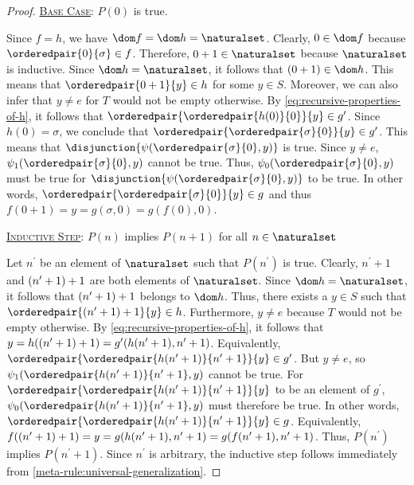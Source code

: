 \begin{proof}
    \vspace{0.3cm}
    \noindent
    \underline{\scshape Base Case}: \( P(0) \) is true.

    \vspace{0.3cm}
    \noindent
    Since \( f = h \), we have \( \dom f = \dom h = \naturalset \). Clearly, \( 0 \in \dom f \) because \( \orderedpair{0}{\sigma} \in f \).
    Therefore, \( 0 + 1 \in \naturalset \) because \( \naturalset \) is inductive.
    Since \( \dom h = \naturalset \), it follows that \( \mleft( 0 + 1 \mright) \in \dom h \).
    This means that \( \orderedpair{0 + 1}{y} \in h \) for some \( y \in S \).
    Moreover, we can also infer that \( y \neq e \) for \( T \) would not be empty otherwise.
    By \eqref{eq:recursive-properties-of-h}, it follows that \( \orderedpair{\orderedpair{h(0)}{0}}{y} \in g^{\prime} \).
    Since \( h(0) = \sigma \), we conclude that \( \orderedpair{\orderedpair{\sigma}{0}}{y} \in g^{\prime} \).
    This means that \( \disjunction{\psi( \orderedpair{\sigma}{0}, y )} \) is true.
    Since \( y \neq e \), \( \psi_{1}(\orderedpair{\sigma}{0}, y) \) cannot be true.
    Thus, \( \psi_{0}(\orderedpair{\sigma}{0}, y) \) must be true for \( \disjunction{\psi( \orderedpair{\sigma}{0}, y )} \) to be true.
    In other words, \( \orderedpair{\orderedpair{\sigma}{0}}{y} \in g \) and thus \( f(0 + 1) = y = g(\sigma, 0) = g(f(0), 0) \).

    \vspace{0.3cm}
    \noindent
    \underline{\scshape Inductive Step}: \( P(n) \) implies \( P(n + 1) \) for all \( n \in \naturalset \)

    \vspace{0.3cm}
    \noindent
    Let \( n^{\prime} \) be an element of \( \naturalset \) such that \( P(n^{\prime}) \) is true.
    Clearly, \( n^{\prime} + 1 \) and \( \mleft( n^{\prime} + 1 \mright) + 1 \) are both elements of \( \naturalset \).
    Since \( \dom h = \naturalset \), it follows that \( \mleft( n^{\prime} + 1 \mright) + 1 \) belongs to \( \dom h \).
    Thus, there exists a \( y \in S \) such that \( \orderedpair{\mleft( n^{\prime} + 1 \mright) + 1}{y} \in h \).
    Furthermore, \( y \neq e \) because \( T \) would not be empty otherwise.
    By \eqref{eq:recursive-properties-of-h}, it follows that
    \( y = h(\mleft( n^{\prime} + 1 \mright) + 1) = g^{\prime}(h(n^{\prime} + 1), n^{\prime} + 1) \).
    Equivalently, \( \orderedpair{\orderedpair{h(n^{\prime} + 1)}{n^{\prime} + 1}}{y} \in g^{\prime} \).
    But \( y \neq e \), so \( \psi_{1}( \orderedpair{h(n^{\prime} + 1)}{n^{\prime} + 1}, y ) \) cannot be true.
    For \( \orderedpair{\orderedpair{h(n^{\prime} + 1)}{n^{\prime} + 1}}{y} \) to be an element of \( g^{\prime} \),
    \( \psi_{0}( \orderedpair{h(n^{\prime} + 1)}{n^{\prime} + 1}, y ) \) must therefore be true.
    In other words, \( \orderedpair{\orderedpair{h(n^{\prime} + 1)}{n^{\prime} + 1}}{y} \in g \).
    Equivalently, \( f(\mleft( n^{\prime} + 1 \mright) + 1) =  y = g(h(n^{\prime} + 1), n^{\prime} + 1) = g(f(n^{\prime} + 1), n^{\prime} + 1) \).
    Thus, \( P(n^{\prime}) \) implies \( P(n^{\prime} + 1) \).
    Since \( n^{\prime} \) is arbitrary, the inductive step follows immediately from \cref{meta-rule:universal-generalization}.


\end{proof}

